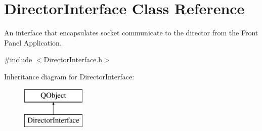 \hypertarget{class_director_interface}{\section{Director\-Interface Class Reference}
\label{class_director_interface}
}


An interface that encapsulates socket communicate to the director from the Front Panel Application.  




{\ttfamily \#include $<$Director\-Interface.\-h$>$}

Inheritance diagram for Director\-Interface\-:\begin{figure}[H]
\begin{center}
\leavevmode
\includegraphics[height=2.000000cm]{class_director_interface}
\end{center}
\end{figure}
